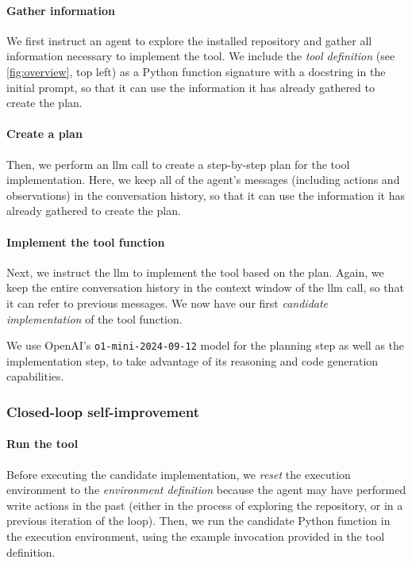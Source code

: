 \paragraph{\:Gather information}
We first instruct an agent to explore the installed repository and gather all information necessary to implement the tool.
We include the \emph{tool definition} (see \cref{fig:overview}, top left) as a Python function signature with a docstring in the initial prompt, so that it can use the information it has already gathered to create the plan.

\paragraph{\:Create a plan}
Then, we perform an \gls{llm} call to create a step-by-step plan for the tool implementation.
Here, we keep all of the agent's messages (including actions and observations) in the conversation history, so that it can use the information it has already gathered to create the plan.

\paragraph{\:Implement the tool function}
Next, we instruct the \gls{llm} to implement the tool based on the plan.
Again, we keep the entire conversation history in the context window of the \gls{llm} call, so that it can refer to previous messages.
We now have our first \emph{candidate implementation} of the tool function.

We use OpenAI's \texttt{o1-mini-2024-09-12} model for the planning step as well as the implementation step, to take advantage of its reasoning and code generation capabilities.


\subsubsection{Closed-loop self-improvement}
\label{app:toolmaker_workflow:iteratively_fixing}

\paragraph{\:Run the tool}
Before executing the candidate implementation, we \emph{reset} the execution environment to the \emph{environment definition} because the agent may have performed write actions in the past (either in the process of exploring the repository, or in a previous iteration of the loop).
Then, we run the candidate Python function in the execution environment, using the example invocation provided in the tool definition.

